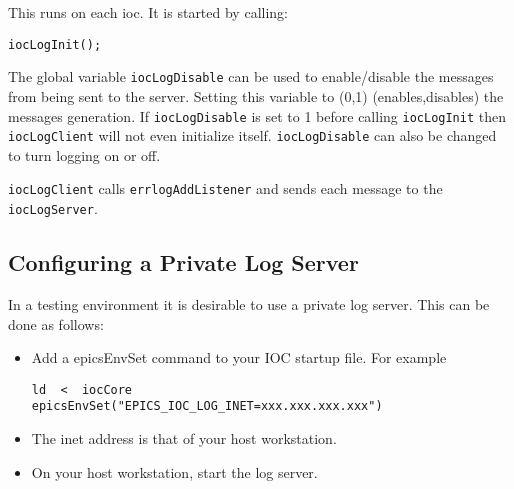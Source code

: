 This runs on each ioc. It is started by calling:

\begin{verbatim}
iocLogInit();
\end{verbatim}

The global variable \verb|iocLogDisable| can be used to enable/disable the messages from being sent to the server. Setting 
this variable to (0,1) (enables,disables) the messages generation. If \verb|iocLogDisable| is set to 1 before calling 
\verb|iocLogInit| then \verb|iocLogClient| will not even initialize itself. \verb|iocLogDisable| can also be changed to turn 
logging on or off.

\verb|iocLogClient| calls \verb|errlogAddListener| and sends each message to the \verb|iocLogServer|.

\subsection{Configuring a Private Log Server}

In a testing environment it is desirable to use a private log server. This can be done as follows:

\begin{itemize}

\item Add a epicsEnvSet command to your IOC startup file. For example

\begin{verbatim}
ld  <  iocCore
epicsEnvSet("EPICS_IOC_LOG_INET=xxx.xxx.xxx.xxx")
\end{verbatim}

\item The inet address is that of your host workstation.

\item On your host workstation, start the log server.

\end{itemize}
